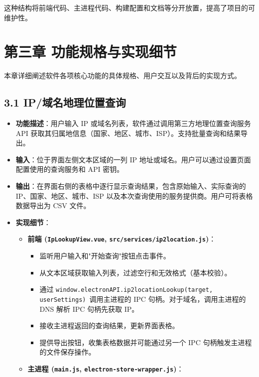 \documentclass{article}
\begin{document}
这种结构将前端代码、主进程代码、构建配置和文档等分开放置，提高了项目的可维护性。

\hrulefill

\section*{第三章 功能规格与实现细节}

本章详细阐述软件各项核心功能的具体规格、用户交互以及背后的实现方式。

\subsection*{3.1 IP/域名地理位置查询}

\begin{itemize}
    \item \textbf{功能描述}：用户输入 IP 或域名列表，软件通过调用第三方地理位置查询服务 API 获取其归属地信息（国家、地区、城市、ISP）。支持批量查询和结果导出。
    \item \textbf{输入}：位于界面左侧文本区域的一列 IP 地址或域名。用户可以通过设置页面配置使用的查询服务和 API 密钥。
    \item \textbf{输出}：在界面右侧的表格中逐行显示查询结果，包含原始输入、实际查询的 IP、国家、地区、城市、ISP 以及本次查询使用的服务提供商。用户可将表格数据导出为 CSV 文件。
    \item \textbf{实现细节}：
    \begin{itemize}
        \item \textbf{前端 (\texttt{IpLookupView.vue}, \texttt{src/services/ip2location.js})}：
        \begin{itemize}
            \item 监听用户输入和"开始查询"按钮点击事件。
            \item 从文本区域获取输入列表，过滤空行和无效格式（基本校验）。
            \item 通过 \texttt{window.electronAPI.ip2locationLookup(target, userSettings)}\ 调用主进程的 IPC 句柄。对于域名，调用主进程的 DNS 解析 IPC 句柄先获取 IP。
            \item 接收主进程返回的查询结果，更新界面表格。
            \item 提供导出按钮，收集表格数据并可能通过另一个 IPC 句柄触发主进程的文件保存操作。
        \end{itemize}
        \item \textbf{主进程 (\texttt{main.js}, \texttt{electron-store-wrapper.js})}：
        \begin{itemize}

\end{itemize}
\end{itemize}
\end{itemize}
\end{document}
